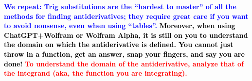 \bigskip
\textcolor{blue}{\bf We repeat: Trig substitutions are the ``hardest to master'' of all the methods for finding antiderivatives; they require great care if you want to avoid nonsense, even when using ``tables''.} \textcolor{black}{\bf Moreover, when using ChatGPT+Wolfram or Wolfram Alpha, it is still on you to understand the domain on which the antiderivative is defined. You cannot just throw in a function, get an answer, snap your fingers, and say you are done!} \textcolor{red}{\bf To understand the domain of the antiderivative, analyze that of the integrand (aka, the function you are integrating).}

\bigskip







    




    


